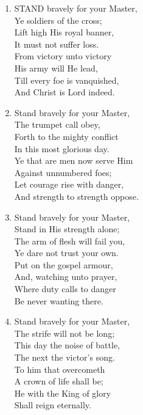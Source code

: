 \documentclass[11pt,a4paper]{article}
\begin{document}
\begin{enumerate}
    \item STAND bravely for your Master, \\
        Ye soldiers of the cross; \\
        Lift high His royal banner, \\
        It must not suffer loss. \\
        From victory unto victory \\
        His army will He lead, \\
        Till every foe is vanquished, \\
        And Christ is Lord indeed.

    \item Stand bravely for your Master, \\
        The trumpet call obey, \\
        Forth to the mighty conflict \\
        In this most glorious day. \\
        Ye that are men now serve Him \\
        Against unnumbered foes; \\
        Let courage rise with danger, \\
        And strength to strength oppose.

    \item Stand bravely for your Master, \\
        Stand in His strength alone; \\
        The arm of flesh will fail you, \\
        Ye dare not trust your own. \\
        Put on the gospel armour, \\
        And, watching unto prayer, \\
        Where duty calls to danger \\
        Be never wanting there.

    \item Stand bravely for your Master, \\
        The strife will not be long; \\
        This day the noise of battle, \\
        The next the victor's song. \\
        To him that overcometh \\
        A crown of life shall be; \\
        He with the King of glory \\
        Shall reign eternally.

\end{enumerate}
\end{document}

